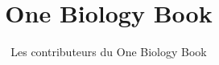 \documentclass[11pt,a4paper,twoside,openany]{book}
\title{One Biology Book}
\author{Les contributeurs du One Biology Book}
\date{\bookdate}
\begin{document}
\frontmatter




\tableofcontents

\mainmatter





\appendix
\part{\omsolutionspart}




\backmatter
\renewcommand{\indexspace}{\par\vskip 8pt plus 4pt minus 4pt\relax}
\printindex
\end{document}
